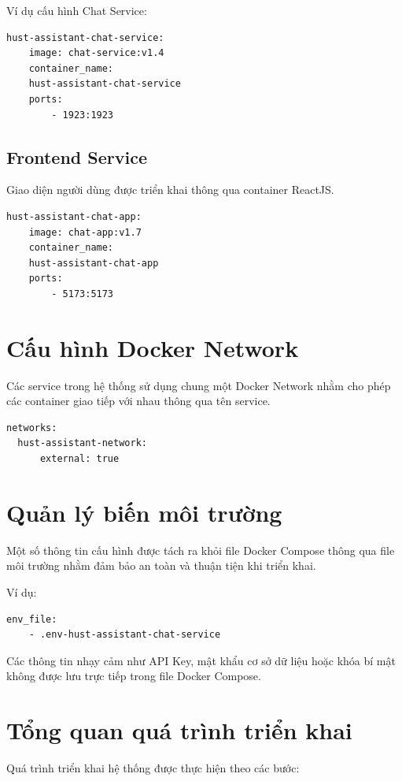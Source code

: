 \documentclass[../DoAn.tex]{subfiles}
\begin{document}
Ví dụ cấu hình Chat Service:

\begin{verbatim}
hust-assistant-chat-service:
    image: chat-service:v1.4
    container_name:
    hust-assistant-chat-service
    ports:
        - 1923:1923
\end{verbatim}



\subsection{Frontend Service}

Giao diện người dùng được triển khai thông qua container ReactJS.

\begin{verbatim}
hust-assistant-chat-app:
    image: chat-app:v1.7
    container_name:
    hust-assistant-chat-app
    ports:
        - 5173:5173
\end{verbatim}



\section{Cấu hình Docker Network}
Các service trong hệ thống sử dụng chung một Docker Network nhằm cho phép các container giao tiếp với nhau thông qua tên service.

\begin{verbatim}
networks:
  hust-assistant-network:
      external: true
\end{verbatim}



\section{Quản lý biến môi trường}

Một số thông tin cấu hình được tách ra khỏi file Docker Compose thông qua file môi trường nhằm đảm bảo an toàn và thuận tiện khi triển khai.

Ví dụ:
\begin{verbatim}
env_file:
    - .env-hust-assistant-chat-service
\end{verbatim}

Các thông tin nhạy cảm như API Key, mật khẩu cơ sở dữ liệu hoặc khóa bí mật không được lưu trực tiếp trong file Docker Compose.

\section{Tổng quan quá trình triển khai}
Quá trình triển khai hệ thống được thực hiện theo các bước:
\end{document}
